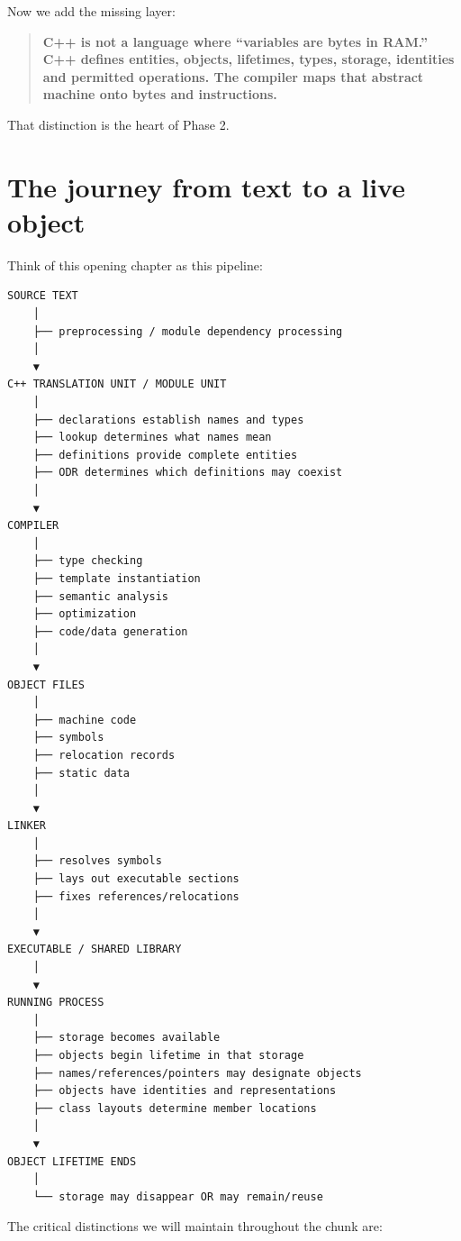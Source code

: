 Now we add the missing layer:

\begin{quote}
\textbf{C++ is not a language where ``variables are bytes in RAM.'' C++ defines entities, objects, lifetimes, types, storage, identities and permitted operations. The compiler maps that abstract machine onto bytes and instructions.}
\end{quote}

That distinction is the heart of Phase 2.

\section{The journey from text to a live object}\label{05-engine-i-ch002-the-journey-from-text-to-a-live-object}

\hypertarget{05-engine-i-ch002-the-journey-from-text-to-a-live-object}{}

Think of this opening chapter as this pipeline:

\begin{verbatim}
SOURCE TEXT
    │
    ├── preprocessing / module dependency processing
    │
    ▼
C++ TRANSLATION UNIT / MODULE UNIT
    │
    ├── declarations establish names and types
    ├── lookup determines what names mean
    ├── definitions provide complete entities
    ├── ODR determines which definitions may coexist
    │
    ▼
COMPILER
    │
    ├── type checking
    ├── template instantiation
    ├── semantic analysis
    ├── optimization
    ├── code/data generation
    │
    ▼
OBJECT FILES
    │
    ├── machine code
    ├── symbols
    ├── relocation records
    ├── static data
    │
    ▼
LINKER
    │
    ├── resolves symbols
    ├── lays out executable sections
    ├── fixes references/relocations
    │
    ▼
EXECUTABLE / SHARED LIBRARY
    │
    ▼
RUNNING PROCESS
    │
    ├── storage becomes available
    ├── objects begin lifetime in that storage
    ├── names/references/pointers may designate objects
    ├── objects have identities and representations
    ├── class layouts determine member locations
    │
    ▼
OBJECT LIFETIME ENDS
    │
    └── storage may disappear OR may remain/reuse
\end{verbatim}

The critical distinctions we will maintain throughout the chunk are:

